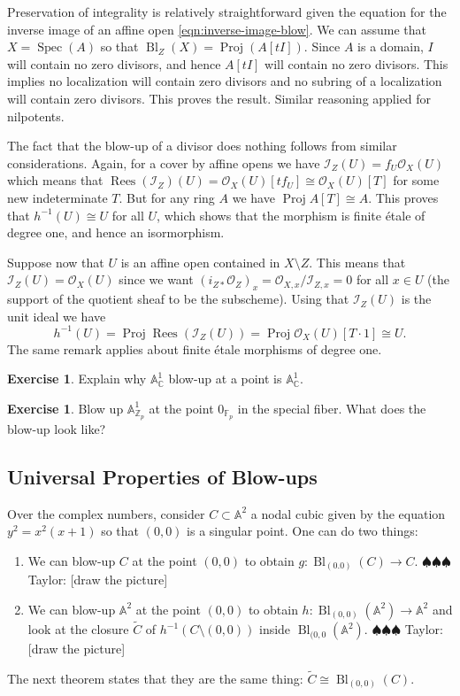 \documentclass[12pt]{article}
\numberwithin{equation}{section}
\theoremstyle{definition}
\newtheorem{exercise}[theorem]{Exercise}
\theoremstyle{remark}
\newcommand{\FF}{\mathbb{F}}
\newcommand{\CC}{\mathbb{C}}
\newcommand{\ZZ}{\mathbb{Z}}
\newcommand{\Ocal}{\mathcal{O}}
\renewcommand{\AA}{\mathbb{A}}
\newcommand{\Spec}{\operatorname{Spec}}
\newcommand{\Proj}{\operatorname{Proj}}
\newcommand{\Bl}{\operatorname{Bl}}
\newcommand{\Ical}{\mathcal{I}}
\newcommand{\Rees}{\operatorname{Rees}}
\newcommand{\taylor}[1]{{\color{blue} \sf $\spadesuit\spadesuit\spadesuit$ Taylor: [#1]}}
\begin{document}
Preservation of integrality is relatively straightforward given the equation for the inverse image of an affine open \eqref{eqn:inverse-image-blow}.
We can assume that $X=\Spec(A)$ so that $\Bl_Z(X) = \Proj( A[tI] )$. 
Since $A$ is a domain, $I$ will contain no zero divisors, and hence $A[tI]$ will contain no zero divisors. 
This implies no localization will contain zero divisors and no subring of a localization will contain zero divisors. 
This proves the result. 
Similar reasoning applied for nilpotents. 

The fact that the blow-up of a divisor does nothing follows from similar considerations. 
Again, for a cover by affine opens we have $\Ical_Z(U) = f_U \Ocal_X(U)$ which means that $\Rees(\Ical_Z)(U) = \Ocal_X(U)[t f_U] \cong \Ocal_X(U)[T]$ for some new indeterminate $T$. 
But for any ring $A$ we have $\Proj A[T] \cong A$. 
This proves that $h^{-1}(U) \cong U$ for all $U$, which shows that the morphism is finite \'etale of degree one, and hence an isormorphism.

Suppose now that $U$ is an affine open contained in $X\setminus Z$. 
This means that $\Ical_Z(U) = \Ocal_X(U)$ since we want $(i_{Z*}\Ocal_Z)_x = \Ocal_{X,x}/\Ical_{Z,x}=0$ for all $x\in U$ (the support of the quotient sheaf to be the subscheme). 
Using that $\Ical_Z(U)$ is the unit ideal we have 
 $$h^{-1}(U) = \Proj \Rees(\Ical_Z(U)) = \Proj \Ocal_X(U)[T\cdot 1] \cong U. $$
The same remark applies about finite \'etale morphisms of degree one.

\begin{exercise}
	Explain why $\AA^1_{\CC}$ blow-up at a point is $\AA^1_{\CC}$. 
\end{exercise}

\begin{exercise}
	Blow up $\AA^1_{\ZZ_p}$ at the point $0_{\FF_p}$ in the special fiber. 
	What does the blow-up look like?
\end{exercise}

\subsection{Universal Properties of Blow-ups}
Over the complex numbers, consider $C \subset \AA^2$ a nodal cubic given by the equation $y^2=x^2(x+1)$ so that $(0,0)$ is a singular point. 
One can do two things: 
\begin{enumerate}
	\item We can blow-up $C$ at the point $(0,0)$ to obtain $g:\Bl_{(0.0)}(C) \to C$. \taylor{draw the picture}
	\item We can blow-up $\AA^2$ at the point $(0,0)$ to obtain $h:\Bl_{(0,0)}(\AA^2)\to \AA^2$ and look at the closure $\widetilde{C}$ of $h^{-1}\left( C \setminus (0,0) \right)$ inside $\Bl_{(0,0}(\AA^2)$. \taylor{draw the picture}
\end{enumerate}
The next theorem states that they are the same thing: $\widetilde{C} \cong \Bl_{(0,0)}(C)$. 
\end{document}
